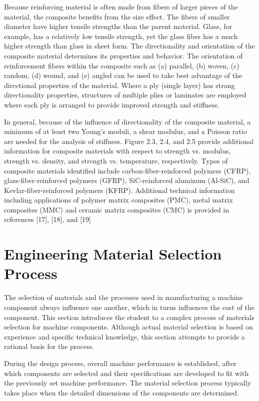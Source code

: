 \documentclass[a4paper,openany,12pt]{book}
\begin{document}
Because reinforcing material is often made from fibers of larger pieces
of the material, the composite benefits from the size effect. The fibers
of smaller diameter have higher tensile strengths than the parent
material. Glass, for example, has a relatively low tensile strength, yet
the glass fiber has a much higher strength than glass in sheet form. The
directionality and orientation of the composite material determines its
properties and behavior. The orientation of reinforcement fibers within
the composite such as (a) parallel, (b) woven, (c) random, (d) wound,
and (e) angled can be used to take best advantage of the directional
properties of the material. Where a ply (single layer) has strong
directionality properties, structures of multiple plies or laminates are
employed where each ply is arranged to provide improved strength and
stiffness.

In general, because of the influence of directionality of the composite
material, a minimum of at least two Young's moduli, a shear modulus, and
a Poisson ratio are needed for the analysis of stiffness. Figure 2.3,
2.4, and 2.5 provide additional information for composite materials with
respect to strength vs. modulus, strength vs. density, and strength vs.
temperature, respectively. Types of composite materials identified
include carbon-fiber-reinforced polymers (CFRP), glass-fiber-reinforced
polymers (GFRP), SiC-reinforced aluminum (Al-SiC), and
Kevlar-fiber-reinforced polymers (KFRP). Additional technical
information including applications of polymer matrix composites (PMC),
metal matrix composites (MMC) and ceramic matrix composites (CMC) is
provided in references [17], [18], and [19]

\section{Engineering Material Selection Process}
\label{engineering-material-selection-process}
The selection of materials and the processes used in manufacturing a
machine component always influence one another, which in turns
influences the cost of the component. This section introduces the
student to a complex process of materials selection for machine
components. Although actual material selection is based on experience
and specific technical knowledge, this section attempts to provide a
rational basis for the process.

During the design process, overall machine performance is established,
after which components are selected and their specifications are
developed to fit with the previously set machine performance. The
material selection process typically takes place when the detailed
dimensions of the components are determined.
\end{document}
